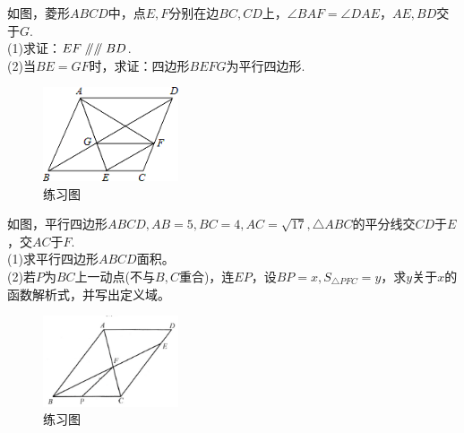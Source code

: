 \documentclass{ecnuthesis}
\newcommand\px{\mathrel{/\mkern-5mu/}}  %
\begin{document}
\begin{problem}
    如图，菱形$ABCD$中，点$E,F$分别在边$BC,CD$上，$\angle BAF=\angle DAE$，$AE,BD$交于$G$. \\
    (1)求证：$EF\px \px BD$. \\
    (2)当$BE=GF$时，求证：四边形$BEFG$为平行四边形. \\
\end{problem}
\begin{figure}[H]
\centering
\includegraphics[width=4cm]{picture/6127.png}
\caption{练习图}
\end{figure}
\begin{problem}
    如图，平行四边形$ABCD,AB=5,BC=4,AC=\sqrt{17},\triangle ABC$的平分线交$CD$于$E$，交$AC$于$F$. \\
    (1)求平行四边形$ABCD$面积。\\
    (2)若$P$为$BC$上一动点(不与$B,C$重合)，连$EP$，设$BP=x,S_{\triangle PFC}=y$，求$y$关于$x$的函数解析式，并写出定义域。\\
\end{problem}
\begin{figure}[H]
\centering
\includegraphics[width=4cm]{picture/6130.png}
\caption{练习图}
\end{figure}
\clearpage
\end{document}
